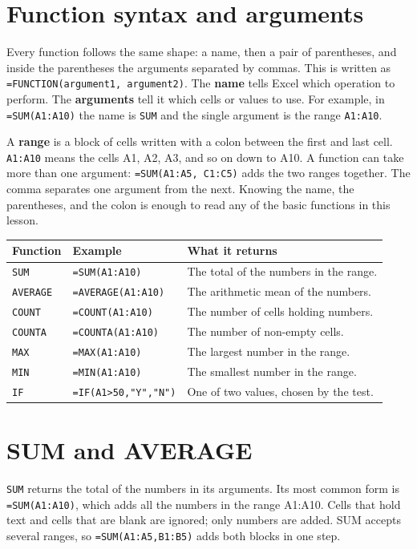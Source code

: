 \documentclass[11pt]{article}
\begin{document}
\section{Function syntax and arguments}
Every function follows the same shape: a name, then a pair of parentheses, and
inside the parentheses the arguments separated by commas. This is written as
\texttt{=FUNCTION(argument1, argument2)}. The \textbf{name} tells Excel which
operation to perform. The \textbf{arguments} tell it which cells or values to
use. For example, in \texttt{=SUM(A1:A10)} the name is \texttt{SUM} and the
single argument is the range \texttt{A1:A10}.

A \textbf{range} is a block of cells written with a colon between the first
and last cell. \texttt{A1:A10} means the cells A1, A2, A3, and so on down to
A10. A function can take more than one argument: \texttt{=SUM(A1:A5, C1:C5)}
adds the two ranges together. The comma separates one argument from the next.
Knowing the name, the parentheses, and the colon is enough to read any of the
basic functions in this lesson.

\begin{center}
\begin{tabular}{p{}p{}p{}}
\toprule
\textbf{Function} & \textbf{Example} & \textbf{What it returns} \\
\midrule
\texttt{SUM} & \texttt{=SUM(A1:A10)} & The total of the numbers in the range. \\
\texttt{AVERAGE} & \texttt{=AVERAGE(A1:A10)} & The arithmetic mean of the numbers. \\
\texttt{COUNT} & \texttt{=COUNT(A1:A10)} & The number of cells holding numbers. \\
\texttt{COUNTA} & \texttt{=COUNTA(A1:A10)} & The number of non-empty cells. \\
\texttt{MAX} & \texttt{=MAX(A1:A10)} & The largest number in the range. \\
\texttt{MIN} & \texttt{=MIN(A1:A10)} & The smallest number in the range. \\
\texttt{IF} & \texttt{=IF(A1>50,"Y","N")} & One of two values, chosen by the test. \\
\bottomrule
\end{tabular}
\end{center}

\section{SUM and AVERAGE}
\texttt{SUM} returns the total of the numbers in its arguments. Its most
common form is \texttt{=SUM(A1:A10)}, which adds all the numbers in the range
A1:A10. Cells that hold text and cells that are blank are ignored; only
numbers are added. SUM accepts several ranges, so \texttt{=SUM(A1:A5,B1:B5)}
adds both blocks in one step.
\end{document}
